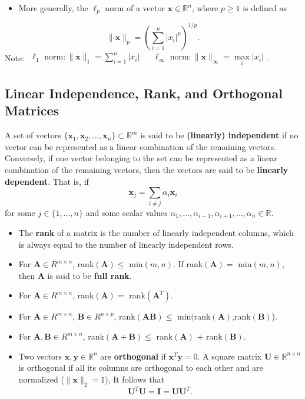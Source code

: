 \begin{itemize}
\item More generally, the $\ell_{p}$ norm of a vector $\textbf{x} \in \mathbb{R}^{n}$, where $p \geq 1$ is defined as 
\end{itemize}
\begin{equation*}
\|\textbf{x}\|_{p}=\left(\sum\limits_{i=1}^{n}|x_{i}|^{p}\right)^{1/p}.
\end{equation*}
Note: $\begin{array}{ccc} \ell_{1} \text{ norm}: \|\textbf{x}\|_{1} = \sum\limits_{i=1}^{n} |x_{i}| && \ell_{\infty} \text{ norm}: \|\textbf{x}\|_{\infty} = \max\limits_{i} |x_{i}| \end{array}$.

\subsection{Linear Independence, Rank, and Orthogonal Matrices}
A set of vectors $\{\textbf{x}_{1},\textbf{x}_{2},\ldots,\textbf{x}_{n}\} \subset \mathbb{R}^{m}$ is said to be {\bf (linearly) independent} if no vector can be represented as a linear combination of the remaining vectors. Conversely, if one vector belonging to the set can be represented as a linear combination of the remaining vectors, then the vectors are said to be {\bf linearly dependent}. That is, if 
\begin{equation*}
\textbf{x}_{j}=\sum\limits_{i\neq j}\alpha_{i}\textbf{x}_{i}
\end{equation*}
for some $j \in \{1,\ldots,n\}$ and some scalar values $\alpha_{1}, \ldots, \alpha_{i-1}, \alpha_{i+1}, \ldots, \alpha_{n} \in \mathbb{R}$. 

\begin{itemize}
\item The {\bf rank} of a matrix is the number of linearly independent columns, which is always equal to the number of linearly independent rows.
\item For $\textbf{A} \in R^{m\times n}$, rank$(\textbf{A}) \leq$ min$(m,n)$. If rank$(\textbf{A})=$ min$(m,n)$, then $\textbf{A}$ is said
to be  {\bf full rank}.
\item For $\textbf{A} \in R^{m\times n}$, rank$(\textbf{A})=$ rank$(\textbf{A}^{T})$.
\item For $\textbf{A} \in R^{m\times n}$,  $\textbf{B} \in R^{n\times p}$, rank$(\textbf{AB}) \leq$ min$($rank$(\textbf{A})$,rank$(\textbf{B})$).
\item For $\textbf{A},\textbf{B} \in R^{m\times n}$, rank$(\textbf{A}+\textbf{B}) \leq$ rank$(\textbf{A})$ + rank$(\textbf{B})$.
\item Two vectors $\textbf{x},\textbf{y} \in \mathbb{R}^{n}$ are {\bf orthogonal} if $\textbf{x}^{T}\textbf{y}=0$. A square matrix $\textbf{U} \in \mathbb{R}^{n\times n}$ is orthogonal if all its columns are orthogonal to each other and are normalized ($\|\textbf{x}\|_{2} = 1$), It follows that
\begin{equation*}
\textbf{U}^{T}\textbf{U}=\textbf{I}=\textbf{UU}^{T}.
\end{equation*}
\end{itemize}


